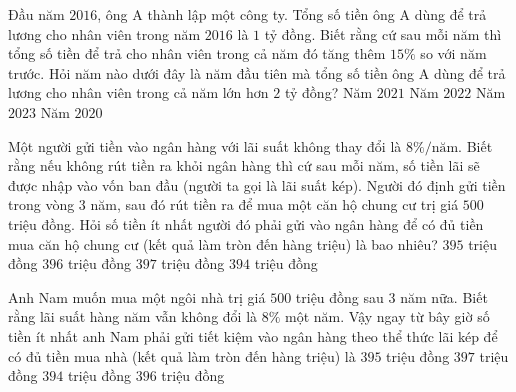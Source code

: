 \begin{ex}
	Đầu năm $2016$, ông A thành lập một công ty. Tổng số tiền ông A dùng để trả lương cho nhân viên trong năm $2016$ là $1$ tỷ đồng. Biết rằng cứ sau mỗi năm thì tổng số tiền để trả cho nhân viên trong cả năm đó tăng thêm $15\%$ so với năm trước. Hỏi năm nào dưới đây là năm đầu tiên mà tổng số tiền ông A dùng để trả lương cho nhân viên trong cả năm lớn hơn $2$ tỷ đồng?
	\choice
	{\True  Năm $2021$ }
	{Năm $2022$}
	{Năm $2023$}
	{Năm $2020$}
\end{ex}
\begin{ex}
	Một người gửi tiền vào ngân hàng với lãi suất không thay đổi là $8\%/\text{năm}$. Biết rằng nếu không rút tiền ra khỏi ngân hàng thì cứ sau mỗi năm, số tiền lãi sẽ được nhập vào vốn ban đầu (người ta gọi là lãi suất kép). Người đó định gửi tiền trong vòng $3$ năm, sau đó rút tiền ra để mua một căn hộ chung cư trị giá $500$ triệu đồng. Hỏi số tiền ít nhất người đó phải gửi vào ngân hàng để có đủ tiền mua căn hộ chung cư (kết quả làm tròn đến hàng triệu) là bao nhiêu?
	\choice
	{$395$ triệu đồng}
	{$396$ triệu đồng}
	{\True $397$ triệu đồng}
	{$394$ triệu đồng}
\end{ex}
\begin{ex}
	Anh Nam muốn mua một ngôi nhà trị giá $ 500 $ triệu đồng sau $ 3 $ năm nữa. Biết rằng lãi suất hàng năm vẫn không đổi là $ 8\% $ một năm. Vậy ngay từ bây giờ số tiền ít nhất anh Nam phải gửi tiết kiệm vào ngân hàng theo thể thức lãi kép để có đủ tiền mua nhà (kết quả làm tròn đến hàng triệu) là
	\choice
	{$ 395 $ triệu đồng}
	{\True $ 397 $ triệu đồng}
	{$ 394 $ triệu đồng}
	{$ 396 $ triệu đồng}
\end{ex}
